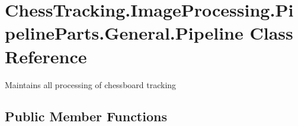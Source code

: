 \hypertarget{class_chess_tracking_1_1_image_processing_1_1_pipeline_parts_1_1_general_1_1_pipeline}{}\section{Chess\+Tracking.\+Image\+Processing.\+Pipeline\+Parts.\+General.\+Pipeline Class Reference}
\label{class_chess_tracking_1_1_image_processing_1_1_pipeline_parts_1_1_general_1_1_pipeline}


Maintains all processing of chessboard tracking  


\subsection*{Public Member Functions}
